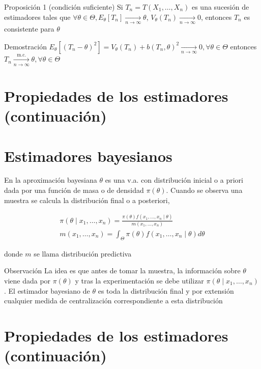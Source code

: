 Proposición 1 (condición suficiente) Si $T_{n}=T\left(X_{1}, \ldots, X_{n}\right)$ es una sucesión de estimadores tales que $\forall \theta \in \Theta, E_{\theta}\left[T_{n}\right] \underset{n \rightarrow \infty}{\longrightarrow} \theta$, $V_{\theta}\left(T_{n}\right) \underset{n \rightarrow \infty}{\longrightarrow} 0$, entonces $T_{n}$ es consistente para $\theta$

Demostración $E_{\theta}\left[\left(T_{n}-\theta\right)^{2}\right]=V_{\theta}\left(T_{n}\right)+b\left(T_{n}, \theta\right)^{2} \underset{n \rightarrow \infty}{\longrightarrow} 0, \forall \theta \in \Theta$ entonces $T_{n} \xrightarrow[n \rightarrow \infty]{\text { m.c. }} \theta, \forall \theta \in \Theta$

\section*{Propiedades de los estimadores (continuación)}
\section*{Estimadores bayesianos}
En la aproximación bayesiana $\theta$ es una v.a. con distribución inicial o a priori dada por una función de masa o de densidad $\pi(\theta)$. Cuando se observa una muestra se calcula la distribución final o a posteriori,

$$
	\begin{gathered}
		\pi\left(\theta \mid x_{1}, \ldots, x_{n}\right)=\frac{\pi(\theta) f\left(x_{1}, \ldots, x_{n} \mid \theta\right)}{m\left(x_{1}, \ldots, x_{n}\right)} \\
		m\left(x_{1}, \ldots, x_{n}\right)=\int_{\Theta} \pi(\theta) f\left(x_{1}, \ldots, x_{n} \mid \theta\right) d \theta
	\end{gathered}
$$

donde $m$ se llama distribución predictiva

Observación La idea es que antes de tomar la muestra, la información sobre $\theta$ viene dada por $\pi(\theta)$ y tras la experimentación se debe utilizar $\pi\left(\theta \mid x_{1}, \ldots, x_{n}\right)$. El estimador bayesiano de $\theta$ es toda la distribución final y por extensión cualquier medida de centralización correspondiente a esta distribución

\section*{Propiedades de los estimadores (continuación)}
